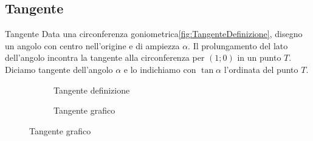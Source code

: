 \subsection{Tangente}
\begin{definizionet}{Tangente}{}
	Data una circonferenza goniometrica\nobs\vref{fig:TangenteDefinizione}, disegno un angolo con centro nell'origine e di ampiezza $\alpha$. Il prolungamento del lato dell'angolo incontra la tangente alla circonferenza per $(1;0)$ in un punto $T$. Diciamo tangente dell'angolo $\alpha$ e lo indichiamo con $\tan\alpha$ l'ordinata del punto $T$.
\end{definizionet}
\label{sec:Tangente}
\begin{figure}
	\begin{subfigure}[b]{.5\linewidth}
		\centering
			
		\caption{Tangente definizione}\label{fig:TangenteDefinizione}
	\end{subfigure}%
	\begin{subfigure}[b]{.5\linewidth}
		\centering
		\caption{Tangente grafico}\label{fig:TangenteGrafico}
	\end{subfigure}
	\label{tab:funztg}
\end{figure}
